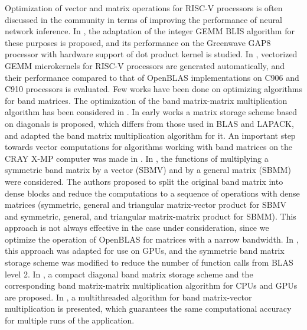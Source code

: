 Optimization of vector and matrix operations for RISC-V processors is often discussed in the community in terms of improving the performance of neural network inference. In \cite{c54}, the adaptation of the integer GEMM BLIS algorithm for these purposes is proposed, and its performance on the Greenwave GAP8 processor with hardware support of dot product kernel is studied. In \cite{c55}, vectorized GEMM microkernels for RISC-V processors are generated automatically, and their performance compared to that of OpenBLAS implementations on C906 and C910 processors is evaluated. Few works have been done on optimizing algorithms for band matrices. The optimization of the band matrix-matrix multiplication algorithm has been considered in \cite{c30,c31,c32,c33,c34,c35,c36}. In early works \cite{c30,c31,c32} a matrix storage scheme based on diagonals is proposed, which differs from those used in BLAS and LAPACK, and adapted the band matrix multiplication algorithm for it. An important step towards vector computations for algorithms working with band matrices on the CRAY X-MP computer was made in \cite{c32}. In \cite{c33}, the functions of multiplying a symmetric band matrix by a vector (SBMV) and by a general matrix (SBMM) were considered. The authors proposed to split the original band matrix into dense blocks and reduce the computations to a sequence of operations with dense matrices (symmetric, general and triangular matrix-vector product for SBMV and symmetric, general, and triangular matrix-matrix product for SBMM). This approach is not always effective in the case under consideration, since we optimize the operation of OpenBLAS for matrices with a narrow bandwidth. In \cite{c34}, this approach was adapted for use on GPUs, and the symmetric band matrix storage scheme was modified to reduce the number of function calls from BLAS level 2. In \cite{c35,c36}, a compact diagonal band matrix storage scheme and the corresponding band matrix-matrix multiplication algorithm for CPUs \cite{c35} and GPUs \cite{c36} are proposed. In \cite{c58}, a multithreaded algorithm for band matrix-vector multiplication is presented, which guarantees the same computational accuracy for multiple runs of the application.

